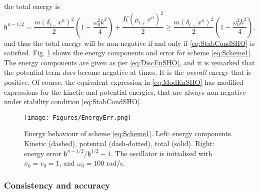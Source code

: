 \documentclass[11pt,twoside,a4paper,english]{book}
\newcommand{\dtm}{\delta_{t-}}
\newcommand{\mtp}{\mu_{t+}}
\begin{document}
the total energy is 
\begin{equation}\label{eq:ModEnSHO}
    \mathfrak{h}^{n-1/2} = \frac{m\left(\dtm x^n \right)^2}{2} \left(1 - \frac{\omega_0^2 k^2}{4}\right) + \frac{K (\mtp x^n)^2}{2} \geq \frac{m\left(\dtm x^n \right)^2}{2} \left(1 - \frac{\omega_0^2 k^2}{4}\right),
\end{equation}
and thus the total energy will be non-negative if and only if \eqref{eq:StabCondSHO} is satisfied. Fig. \ref{fig:EnConsSHO} shows the energy components and error for scheme \eqref{eq:Scheme1}. The energy components are given as per \eqref{eq:DiscEnSHO}, and it is remarked that the potential term \emph{does} become negative at times. It is the \emph{overall} energy that is positive. Of course, the equivalent expression in \eqref{eq:ModEnSHO} has modified expressions for the kinetic and potential energies, that are always non-negative under stability condition \eqref{eq:StabCondSHO}.
\begin{figure}
    \texttt{[image: Figures/EnergyErr.png]}
    \caption{Energy behaviour of scheme \eqref{eq:Scheme1}. Left: energy components. Kinetic (dashed), potential (dash-dotted), total (solid). Right: energy error $\mathfrak{h}^{n-1/2}/\mathfrak{h}^{1/2}-1$. The oscillator is initialised with $x_0=v_0=1$, and $\omega_0=100$ rad/s.}\label{fig:EnConsSHO}
\end{figure}




\subsubsection{Consistency and accuracy}
\end{document}
